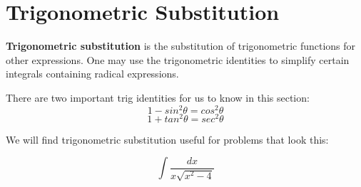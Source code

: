 

\section{Trigonometric Substitution}

\textbf{Trigonometric substitution} is the substitution of trigonometric functions for other expressions. One may use the trigonometric identities to simplify certain integrals containing radical expressions.

There are two important trig identities for us to know in this section:
\[ 1-sin^{2}\theta=cos^{2}\theta \]
\[ 1+tan^{2}\theta=sec^{2}\theta \]

We will find trigonometric substitution useful for problems that look this:

\[ \int \frac{dx} {x \sqrt{x^{2}-4}} \]

